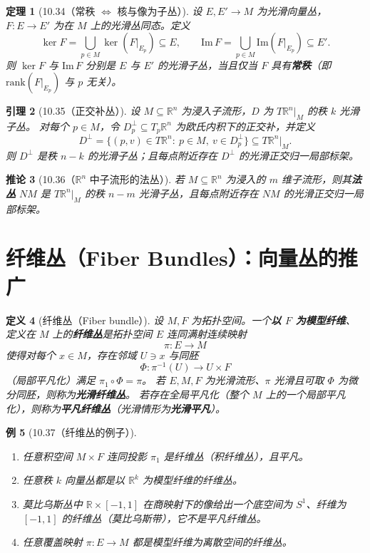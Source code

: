 \documentclass[12pt]{article}
\newtheorem{definition}{定义}[section]
\newtheorem{theorem}[definition]{定理}
\newtheorem{lemma}[definition]{引理}
\newtheorem{corollary}[definition]{推论}
\newtheorem{example}[definition]{例}
\begin{document}
\begin{theorem}[10.34（常秩 $\Leftrightarrow$ 核与像为子丛）]
设 $E,E'\to M$ 为光滑向量丛，$F:E\to E'$ 为在 $M$ 上的光滑丛同态。定义
\[
\ker F=\bigcup_{p\in M}\ker(F|_{E_p})\subseteq E,\qquad
\mathrm{Im}\,F=\bigcup_{p\in M}\mathrm{Im}(F|_{E_p})\subseteq E'.
\]
则 $\ker F$ 与 $\mathrm{Im}\,F$ 分别是 $E$ 与 $E'$ 的光滑子丛，当且仅当 $F$ 具有\textbf{常秩}（即 $\mathrm{rank}(F|_{E_p})$ 与 $p$ 无关）。
\end{theorem}

\begin{lemma}[10.35（正交补丛）]
设 $M\subseteq \mathbb{R}^n$ 为浸入子流形，$D$ 为 $T\mathbb{R}^n|_M$ 的秩 $k$ 光滑子丛。
对每个 $p\in M$，令 $D_p^\perp\subseteq T_p\mathbb{R}^n$ 为欧氏内积下的正交补，并定义
\[
D^\perp=\{(p,v)\in T\mathbb{R}^n:\ p\in M,\ v\in D_p^\perp\}\subseteq T\mathbb{R}^n|_M.
\]
则 $D^\perp$ 是秩 $n-k$ 的光滑子丛；且每点附近存在 $D^\perp$ 的光滑正交归一局部标架。
\end{lemma}

\begin{corollary}[10.36（$\mathbb{R}^n$ 中子流形的法丛）]
若 $M\subseteq \mathbb{R}^n$ 为浸入的 $m$ 维子流形，则其\textbf{法丛} $NM$ 是 $T\mathbb{R}^n|_M$ 的秩 $n-m$ 光滑子丛，且每点附近存在 $NM$ 的光滑正交归一局部标架。
\end{corollary}

\section{纤维丛（Fiber Bundles）：向量丛的推广}

\begin{definition}[纤维丛（Fiber bundle）]
设 $M,F$ 为拓扑空间。一个\textbf{以 $F$ 为模型纤维}、定义在 $M$ 上的\textbf{纤维丛}是拓扑空间 $E$ 连同满射连续映射
\[
\pi:E\to M
\]
使得对每个 $x\in M$，存在邻域 $U\ni x$ 与同胚
\[
\Phi:\pi^{-1}(U)\to U\times F
\]
（局部平凡化）满足 $\pi_1\circ\Phi=\pi$。
若 $E,M,F$ 为光滑流形、$\pi$ 光滑且可取 $\Phi$ 为微分同胚，则称为\textbf{光滑纤维丛}。
若存在全局平凡化（整个 $M$ 上的一个局部平凡化），则称为\textbf{平凡纤维丛}（光滑情形为\textbf{光滑平凡}）。
\end{definition}

\begin{example}[10.37（纤维丛的例子）]
\begin{enumerate}[label=(\alph*)]
\item 任意积空间 $M\times F$ 连同投影 $\pi_1$ 是纤维丛（积纤维丛），且平凡。
\item 任意秩 $k$ 向量丛都是以 $\mathbb{R}^k$ 为模型纤维的纤维丛。
\item 莫比乌斯丛中 $\mathbb{R}\times[-1,1]$ 在商映射下的像给出一个底空间为 $S^1$、纤维为 $[-1,1]$ 的纤维丛（莫比乌斯带），它不是平凡纤维丛。
\item 任意覆盖映射 $\pi:E\to M$ 都是模型纤维为离散空间的纤维丛。
\end{enumerate}
\end{example}
\end{document}
